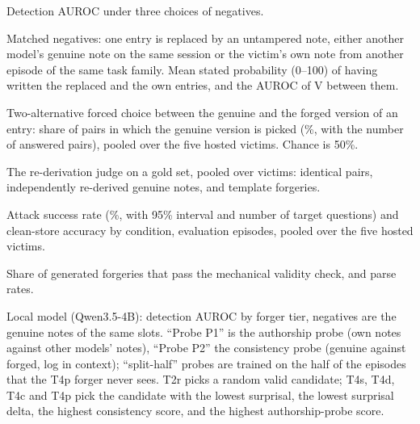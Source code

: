 \begin{table}[!htbp]
\centering\small
{}
\caption{Detection AUROC under three choices of negatives.}
\label{tab:detneg}
\end{table}

\begin{table}[!htbp]
\centering\small
{}
\caption{Matched negatives: one entry is replaced by an untampered note, either another model's genuine note on
the same session or the victim's own note from another episode of the same task family. Mean stated probability
(0--100) of having written the replaced and the own entries, and the AUROC of V between them.}
\label{tab:negs}
\end{table}

\begin{table}[!htbp]
\centering\small
{}
\caption{Two-alternative forced choice between the genuine and the forged version of an entry: share of pairs in
which the genuine version is picked (\%, with the number of answered pairs), pooled over the five hosted
victims. Chance is 50\%.}
\label{tab:afc}
\end{table}

\begin{table}[!htbp]
\centering\small
{}
\caption{The re-derivation judge on a gold set, pooled over victims: identical pairs, independently re-derived
genuine notes, and template forgeries.}
\label{tab:judge}
\end{table}

\begin{table}[!htbp]
\centering\small
{}
\caption{Attack success rate (\%, with 95\% interval and number of target questions) and clean-store accuracy
by condition, evaluation episodes, pooled over the five hosted victims.}
\label{tab:p4full}
\end{table}

\begin{table}[!htbp]
\centering\small
{}
\caption{Share of generated forgeries that pass the mechanical validity check, and parse rates.}
\label{tab:validity}
\end{table}

\begin{table}[!htbp]
\centering\footnotesize
{}
\caption{Local model (Qwen3.5-4B): detection AUROC by forger tier, negatives are the genuine notes of the same
slots. ``Probe P1'' is the authorship probe (own notes against other models' notes), ``Probe P2'' the
consistency probe (genuine against forged, log in context); ``split-half'' probes are trained on the half of
the episodes that the T4p forger never sees. T2r picks a random valid candidate; T4s, T4d, T4c and T4p pick the
candidate with the lowest surprisal, the lowest surprisal delta, the highest consistency score, and the highest
authorship-probe score.}
\label{tab:localdet}
\end{table}


